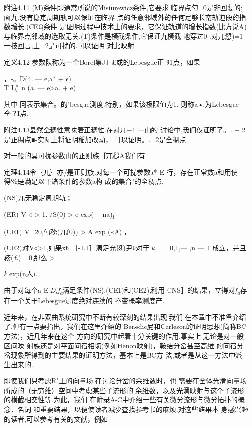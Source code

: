 附注4.11 (M)条件即通常所说的Misiurewicz条件,它要求
临界点勺=0是非回复的;面九.没有稳定周期轨可以保证在临界
点的任意邻域外的任何足够长南轨道段的指数增长.(CEQ条件
是证明过程中技术上的要求，它保证轨道的增长指数(比方说A)
与临界点邻域的选取无关.(T)条件是橫截条件,它保证九橫截 地穿过0 .对兀愆)=1
一技回言,丄=2是可扰的.可以证明 对此映射

定义4.12 参数队称为一个Borel集JJ £或的Lebesgue正 91点，如果

，-{\textbar{}。D(4. --- e,a* + e) \textbar{}\\
}T I\# n (a. --- e\textgreater{}a. + e) \textbar{}

其中 冋表示集合。的"besgue測度.特别，如果该极限值为1,
则称a•,为Lebesgue全？I点.

附注4.13显然全稠性意味着正稠性.在对兀=1 一山的 讨论中,我们仅证明了。. =
2是正稠点■-实际上将证明稲加改动， 可以证明。.=2是全稠点.

对一般的具可扰参数山的正则族｛兀槌A我们有

定理4.14令｛兀｝亦/是正则族.对每一个可扰参数a* E
行，存在正常数a和用使得％是满足以下诸条件的参数a构 成的集合"的全稠点.

(NS)兀无稳定周期轨；

(ER) V « \textgreater{} 1. \textbar{}/S(0) \textbar{} \textgreater{} e
exp(--- na)\textsubscript{f}

(CE1) V ''20,\textbar{}勺務(兀(0))\textbar{} \textgreater{} A exp («A)；

(CE2)对V«\textgreater{}1,如果x6 ［-1.1］满足充愆)尹0对于 \emph{k} ==
0,1,--- ,n --- 1 成立，并且務(£)= 0,那么 \textbar{} \textgreater{}

\emph{k} exp(n人).

由于对每个a E \emph{D,f\textsubscript{a}}满足条件(NS),(CE1)和(CE2),利用
CNS］的结果，立得对\emph{f\textsubscript{a}}存在一个关于Lebesgue测度绝对连续的
不变概率测度产.

近年来，在非双曲系统研究中不断有较深刻的结果出现.我们
在本章中不准备介绍了.但有一点要指出，我们在这里介绍的
Benedic屁和Carleson的证明思想(简称BC方法)，近几年来在这个
方向的研究中起着十分关键的作用.事实上,无论是对一般区间映
射族还是对平面间宿相切(例如Henon映射)，鞍结分岔甚至高维
的同宿分岔现象所得到的主要结果的证明方法，基本上是BC方
法,或者是从这一方法中派生出来的.

即使我们只考虑R"上的向量场.在讨论分岔的余维数时，也
需要在全体光滑向量场所成的（无穷维）空间中考虑某些子流形的
余维数，以及光滑映射与这个子流形的横截相交性等.为此，我们
在附录A-C中介绍一些有关微分流形与微分拓扑的概念、名词
和重要结果，以便使读者减少査找参考书的麻烦.对这些结果本
身感兴趣的读者,可以参考有关的文献，例如

